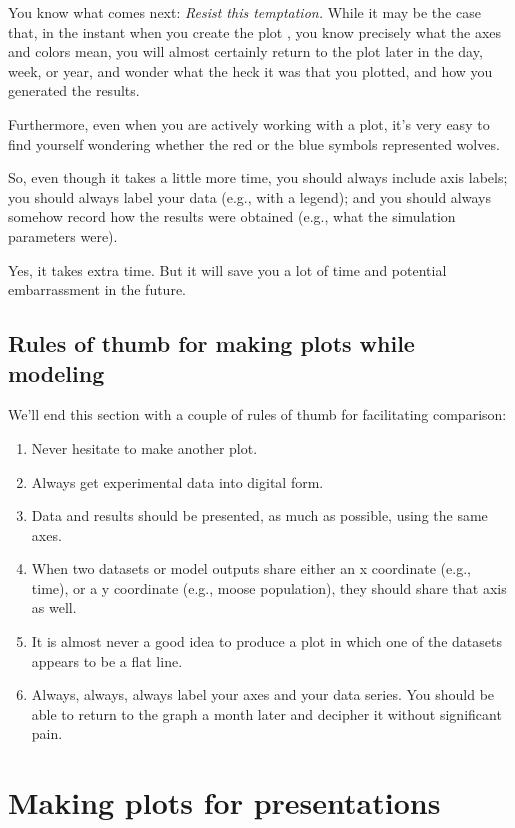 You know what comes next:  {\it Resist this temptation.}  While it may be the case that, in the instant when you create the plot , you know precisely what the axes and colors mean, you will almost certainly return to the plot later in the day, week, or year, and wonder what the heck it was that you plotted, and how you generated the results.  

Furthermore, even when you are actively working with a plot, it's very easy to find yourself wondering whether the red or the blue symbols represented wolves.

So, even though it takes a little more time, you should always include axis labels; you should always label your data (e.g., with a legend); and you should always somehow record how the results were obtained (e.g., what the simulation parameters were).   

Yes, it takes extra time.  But it will save you a lot of time and potential embarrassment in the future.

\subsection{Rules of thumb for making plots while modeling}

We'll end this section with a couple of rules of thumb for facilitating comparison:
\begin{enumerate}
\item Never hesitate to make another plot.
\item Always get experimental data into digital form.
\item Data and results should be presented, as much as possible, using the same axes.
\item When two datasets or model outputs share either an x coordinate (e.g., time), or a y coordinate (e.g., moose population), they should share that axis as well.
\item It is almost never a good idea to produce a plot in which one of the datasets appears to be a flat line.
\item Always, always, always label your axes and your data series.  You should be able to return to the graph a month later and decipher it without significant pain.
\end{enumerate}

\clearpage

\section{Making plots for presentations}

